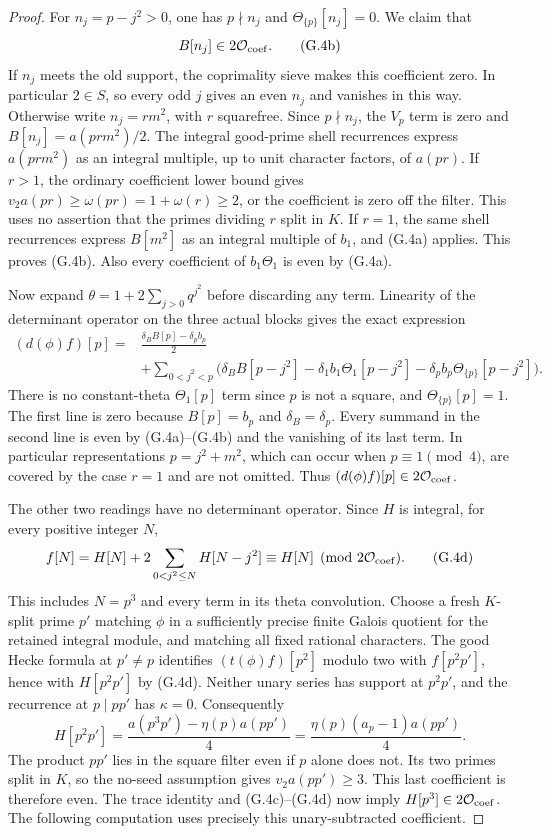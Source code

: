 \begin{proof}
For $n_j=p-j^2>0$, one has $p\nmid n_j$ and
$\Theta_{\{p\}}[n_j]=0$.  We claim that
\[
                           B[n_j]\in2\mathcal O_{\rm coef}.    \tag{G.4b}
\]
If $n_j$ meets the old support, the coprimality sieve makes this
coefficient zero.  In particular $2\in S$, so every odd $j$ gives
an even $n_j$ and vanishes in this way.  Otherwise write
$n_j=r m^2$, with $r$ squarefree.
Since $p\nmid n_j$, the $V_p$ term is zero and
$B[n_j]=a(prm^2)/2$.  The integral good-prime shell recurrences
express $a(prm^2)$ as an integral multiple, up to unit character
factors, of $a(pr)$.  If $r>1$, the ordinary coefficient lower
bound gives $v_2a(pr)\ge\omega(pr)=1+\omega(r)\ge2$, or the
coefficient is zero off the filter.  This uses no assertion that
the primes dividing $r$ split in $K$.  If $r=1$, the same shell
recurrences express $B[m^2]$ as an integral multiple of $b_1$,
and (G.4a) applies.  This proves (G.4b).  Also every coefficient
of $b_1\Theta_1$ is even by (G.4a).

Now expand $\theta=1+2\sum_{j>0}q^{j^2}$ before discarding any
term.  Linearity of the determinant operator on the three actual
blocks gives the exact expression
\[
\begin{split}
 (d(\phi)f)[p]
 ={}&\frac{\delta_B B[p]-\delta_p b_p}{2}\\
 &+\sum_{0<j^2<p}
 \bigl(\delta_B B[p-j^2]
       -\delta_1 b_1\Theta_1[p-j^2]
       -\delta_p b_p\Theta_{\{p\}}[p-j^2]\bigr).
\end{split}                                                     \tag{G.4c}
\]
There is no constant-theta $\Theta_1[p]$ term since $p$ is not
a square, and $\Theta_{\{p\}}[p]=1$.
The first line is zero because $B[p]=b_p$ and
$\delta_B=\delta_p$.  Every summand in the second line is even
by (G.4a)--(G.4b) and the vanishing of its last term.  In particular
representations $p=j^2+m^2$, which can occur when $p\equiv1\pmod4$,
are covered by the case $r=1$ and are not omitted.  Thus
$(d(\phi)f)[p]\in2\mathcal O_{\rm coef}$.

The other two readings have no determinant operator.  Since $H$
is integral, for every positive integer $N$,
\[
 f[N]=H[N]+2\sum_{0<j^2\le N}H[N-j^2]
                 \equiv H[N]\pmod{2\mathcal O_{\rm coef}}.     \tag{G.4d}
\]
This includes $N=p^3$ and every term in its theta convolution.
Choose a fresh $K$-split prime $p'$ matching $\phi$ in a sufficiently
precise finite Galois quotient for the retained integral module,
and matching all fixed rational characters.  The good Hecke formula
at $p'\ne p$ identifies $(t(\phi)f)[p^2]$ modulo two with
$f[p^2p']$, hence with $H[p^2p']$ by (G.4d).
Neither unary series has support at $p^2p'$, and the recurrence at
$p\mid pp'$ has $\kappa=0$.  Consequently
\[
 H[p^2p']=\frac{a(p^3p')-\eta(p)a(pp')}{4}
        =\frac{\eta(p)(a_p-1)a(pp')}{4}.
\]
The product $pp'$ lies in the square filter even if $p$ alone does
not.  Its two primes split in $K$, so the no-seed assumption gives
$v_2a(pp')\ge3$.  This last coefficient is therefore even.
The trace identity and (G.4c)--(G.4d) now imply
$H[p^3]\in2\mathcal O_{\rm coef}$.  The following computation
uses precisely this unary-subtracted coefficient.


\end{proof}
